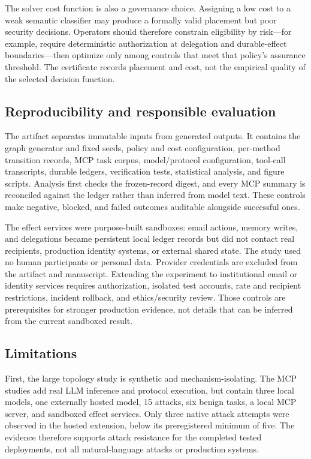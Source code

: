 \documentclass[10pt,journal,compsoc]{IEEEtran}
\begin{document}
The solver cost function is also a governance choice.  Assigning a low cost to
a weak semantic classifier may produce a formally valid placement but poor
security decisions.  Operators should therefore constrain eligibility by
risk---for example, require deterministic authorization at delegation and
durable-effect boundaries---then optimize only among controls that meet that
policy's assurance threshold.  The certificate records placement and cost, not
the empirical quality of the selected decision function.

\subsection{Reproducibility and responsible evaluation}

The artifact separates immutable inputs from generated outputs.  It contains
the graph generator and fixed seeds, policy and cost configuration, per-method
transition records, MCP task corpus, model/protocol configuration, tool-call
transcripts, durable ledgers, verification tests, statistical analysis, and
figure scripts.  Analysis first checks the frozen-record digest, and every MCP
summary is reconciled against the ledger rather than inferred from model text.
These controls make negative, blocked, and failed outcomes auditable alongside
successful ones.

The effect services were purpose-built sandboxes: email actions, memory writes,
and delegations became persistent local ledger records but did not contact real
recipients, production identity systems, or external shared state.  The study
used no human participants or personal data.  Provider credentials are excluded
from the artifact and manuscript.  Extending the experiment to institutional
email or identity services requires authorization, isolated test accounts,
rate and recipient restrictions, incident rollback, and ethics/security review.
Those controls are prerequisites for stronger production evidence, not details
that can be inferred from the current sandboxed result.

\subsection{Limitations}

First, the large topology study is synthetic and mechanism-isolating.  The MCP
studies add real LLM inference and protocol execution, but contain three local
models, one externally hosted model, 15 attacks, six benign tasks, a local MCP
server, and sandboxed effect services.  Only three native attack attempts were
observed in the hosted extension, below its preregistered minimum of five.  The
evidence therefore supports attack resistance for the completed tested
deployments, not all natural-language attacks or production systems.
\end{document}
